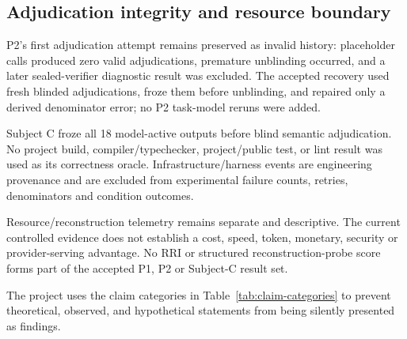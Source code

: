 \subsection{Adjudication integrity and resource boundary}

P2's first adjudication attempt remains preserved as invalid history: placeholder calls produced zero valid adjudications, premature unblinding occurred, and a later sealed-verifier diagnostic result was excluded. The accepted recovery used fresh blinded adjudications, froze them before unblinding, and repaired only a derived denominator error; no P2 task-model reruns were added.

Subject C froze all 18 model-active outputs before blind semantic adjudication. No project build, compiler/typechecker, project/public test, or lint result was used as its correctness oracle. Infrastructure/harness events are engineering provenance and are excluded from experimental failure counts, retries, denominators and condition outcomes.

Resource/reconstruction telemetry remains separate and descriptive. The current controlled evidence does not establish a cost, speed, token, monetary, security or provider-serving advantage. No RRI or structured reconstruction-probe score forms part of the accepted P1, P2 or Subject-C result set.

The project uses the claim categories in Table~\ref{tab:claim-categories} to prevent theoretical, observed, and hypothetical statements from being silently presented as findings.


